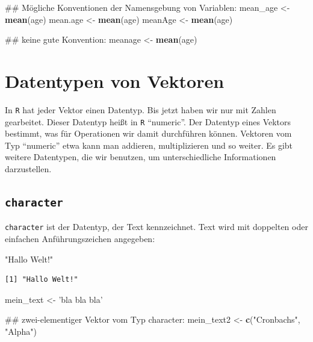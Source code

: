 \documentclass[12pt,]{tufte-book}
\newenvironment{Shaded}{\begin{snugshade}}{\end{snugshade}}
\newcommand{\KeywordTok}[1]{\textcolor[rgb]{0.13,0.29,0.53}{\textbf{#1}}}
\newcommand{\StringTok}[1]{\textcolor[rgb]{0.31,0.60,0.02}{#1}}
\newcommand{\NormalTok}[1]{#1}
\theoremstyle{definition}
\theoremstyle{definition}
\theoremstyle{definition}
\theoremstyle{remark}
\begin{document}
\begin{Shaded}
\begin{Highlighting}[]
\NormalTok{## Mögliche Konventionen der Namensgebung von Variablen:}
\NormalTok{mean_age <-}\StringTok{ }\KeywordTok{mean}\NormalTok{(age)}
\NormalTok{mean.age <-}\StringTok{ }\KeywordTok{mean}\NormalTok{(age)}
\NormalTok{meanAge  <-}\StringTok{ }\KeywordTok{mean}\NormalTok{(age)}

\NormalTok{## keine gute Konvention:}
\NormalTok{meanage  <-}\StringTok{ }\KeywordTok{mean}\NormalTok{(age)}
\end{Highlighting}
\end{Shaded}

\section{Datentypen von Vektoren}\label{datentypen-von-vektoren}

In \texttt{R} hat jeder Vektor einen Datentyp. Bis jetzt haben wir nur
mit Zahlen gearbeitet. Dieser Datentyp heißt in \texttt{R} ``numeric''.
Der Datentyp eines Vektors bestimmt, was für Operationen wir damit
durchführen können. Vektoren vom Typ ``numeric'' etwa kann man addieren,
multiplizieren und so weiter. Es gibt weitere Datentypen, die wir
benutzen, um unterschiedliche Informationen darzustellen.

\subsection{\texorpdfstring{\texttt{character}}{character}}\label{character}

\texttt{character} ist der Datentyp, der Text kennzeichnet. Text wird
mit doppelten oder einfachen Anführungszeichen angegeben:

\begin{Shaded}
\begin{Highlighting}[]
\StringTok{"Hallo Welt!"}
\end{Highlighting}
\end{Shaded}

\begin{verbatim}
[1] "Hallo Welt!"
\end{verbatim}

\begin{Shaded}
\begin{Highlighting}[]

\NormalTok{mein_text <-}\StringTok{ 'bla bla bla'}

\NormalTok{## zwei-elementiger Vektor vom Typ character:}
\NormalTok{mein_text2 <-}\StringTok{ }\KeywordTok{c}\NormalTok{(}\StringTok{"Cronbachs"}\NormalTok{, }\StringTok{"Alpha"}\NormalTok{)}
\end{Highlighting}
\end{Shaded}
\end{document}
